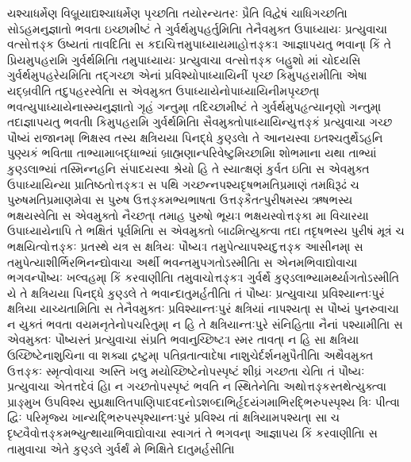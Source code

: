 \documentclass[a4paper,12pt]{article}
\begin{document}
યશ્ચાધર્મેણ વિબ્રૂયાદ્યશ્ચાધર્મેણ પૃચ્છતિ।
તયોરન્યતરઃ પ્રૈતિ વિદ્વેષં ચાધિગચ્છતિ।
સોઽહમનુજ્ઞાતો ભવતા ઇચ્છામીષ્ટં તે ગુર્વર્થમુપહર્તુમિતિ।
તેનૈવમુક્ત ઉપાધ્યાયઃ પ્રત્યુવાચ। વત્સોત્તઙ્ક ઉષ્યતાં તાવદિતિ।
સ કદાચિત્તમુપાધ્યાયમાહોત્તઙ્કઃ। આજ્ઞાપયતુ ભવાન્। કિં તે પ્રિયમુપહરામિ ગુર્વર્થમિતિ।
તમુપાધ્યાયઃ પ્રત્યુવાચ। વત્સોત્તઙ્ક બહુશો માં ચોદયસિ ગુર્વર્થમુપહરેયમિતિ। તદ્ગચ્છ। એનાં પ્રવિશ્યોપાધ્યાયિનીં પૃચ્છ કિમુપહરામીતિ। એષા યદ્બ્રવીતિ તદુપહરસ્વેતિ।
સ એવમુક્ત ઉપાધ્યાયેનોપાધ્યાયિનીમપૃચ્છત્। ભવત્યુપાધ્યાયેનાસ્મ્યનુજ્ઞાતો ગૃહં ગન્તુમ્। તદિચ્છામીષ્ટં તે ગુર્વર્થમુપહૃત્યાનૃણો ગન્તુમ્। તદાજ્ઞાપયતુ ભવતી। કિમુપહરામિ ગુર્વર્થમિતિ।
સૈવમુક્તોપાધ્યાયિન્યુત્તઙ્કં પ્રત્યુવાચ। ગચ્છ પૌષ્યં રાજાનમ્। ભિક્ષસ્વ તસ્ય ક્ષત્રિયયા પિનદ્ધે કુણ્ડલે। તે આનયસ્વ। ઇતશ્ચતુર્થેઽહનિ પુણ્યકં ભવિતા। તાભ્યામાબદ્ધાભ્યાં બ્રાહ્મણાન્પરિવેષ્ટુમિચ્છામિ। શોભમાના યથા તાભ્યાં કુણ્ડલાભ્યાં તસ્મિન્નહનિ સંપાદયસ્વ। શ્રેયો હિ તે સ્યાત્ક્ષણં કુર્વત ઇતિ।
સ એવમુક્ત ઉપાધ્યાયિન્યા પ્રાતિષ્ઠતોત્તઙ્કઃ। સ પથિ ગચ્છન્નપશ્યદૃષભમતિપ્રમાણં તમધિરૂઢં ચ પુરુષમતિપ્રમાણમેવ।
સ પુરુષ ઉત્તઙ્કમભ્યભાષત। ઉત્તઙ્કૈતત્પુરીષમસ્ય ઋષભસ્ય ભક્ષયસ્વેતિ।
સ એવમુક્તો નૈચ્છત્।
તમાહ પુરુષો ભૂયઃ। ભક્ષયસ્વોત્તઙ્ક। મા વિચારય। ઉપાધ્યાયેનાપિ તે ભક્ષિતં પૂર્વમિતિ।
સ એવમુક્તો બાઢમિત્યુક્ત્વા તદા તદૃષભસ્ય પુરીષં મૂત્રં ચ ભક્ષયિત્વોત્તઙ્કઃ પ્રતસ્થે યત્ર સ ક્ષત્રિયઃ પૌષ્યઃ।
તમુપેત્યાપશ્યદુત્તઙ્ક આસીનમ્। સ તમુપેત્યાશીર્ભિરભિનન્દ્યોવાચ। અર્થી ભવન્તમુપગતોઽસ્મીતિ।
સ એનમભિવાદ્યોવાચ। ભગવન્પૌષ્યઃ ખલ્વહમ્। કિં કરવાણીતિ।
તમુવાચોત્તઙ્કઃ। ગુર્વર્થે કુણ્ડલાભ્યામર્થ્યાગતોઽસ્મીતિ યે તે ક્ષત્રિયયા પિનદ્ધે કુણ્ડલે તે ભવાન્દાતુમર્હતીતિ।
તં પૌષ્યઃ પ્રત્યુવાચ। પ્રવિશ્યાન્તઃપુરં ક્ષત્રિયા યાચ્યતામિતિ।
સ તેનૈવમુક્તઃ પ્રવિશ્યાન્તઃપુરં ક્ષત્રિયાં નાપશ્યત્।
સ પૌષ્યં પુનરુવાચ। ન યુક્તં ભવતા વયમનૃતેનોપચરિતુમ્। ન હિ તે ક્ષત્રિયાન્તઃપુરે સંનિહિતા। નૈનાં પશ્યામીતિ।
સ એવમુક્તઃ પૌષ્યસ્તં પ્રત્યુવાચ। સંપ્રતિ ભવાનુચ્છિષ્ટઃ। સ્મર તાવત્। ન હિ સા ક્ષત્રિયા ઉચ્છિષ્ટેનાશુચિના વા શક્યા દ્રષ્ટુમ્। પતિવ્રતાત્વાદેષા નાશુચેર્દર્શનમુપૈતીતિ।
અથૈવમુક્ત ઉત્તઙ્કઃ સ્મૃત્વોવાચ। અસ્તિ ખલુ મયોચ્છિષ્ટેનોપસ્પૃષ્ટં શીઘ્રં ગચ્છતા ચેતિ।
તં પૌષ્યઃ પ્રત્યુવાચ। એતત્તદેવં હિ। ન ગચ્છતોપસ્પૃષ્ટં ભવતિ ન સ્થિતેનેતિ।
અથોત્તઙ્કસ્તથેત્યુક્ત્વા પ્રાઙ્મુખ ઉપવિશ્ય સુપ્રક્ષાલિતપાણિપાદવદનોઽશબ્દાભિર્હૃદયંગમાભિરદ્ભિરુપસ્પૃશ્ય ત્રિઃ પીત્વા દ્વિઃ પરિમૃજ્ય ખાન્યદ્ભિરુપસ્પૃશ્યાન્તઃપુરં પ્રવિશ્ય તાં ક્ષત્રિયામપશ્યત્।
સા ચ દૃષ્ટ્વૈવોત્તઙ્કમભ્યુત્થાયાભિવાદ્યોવાચ। સ્વાગતં તે ભગવન્। આજ્ઞાપય કિં કરવાણીતિ।
સ તામુવાચ। એતે કુણ્ડલે ગુર્વર્થં મે ભિક્ષિતે દાતુમર્હસીતિ।
\end{document}
